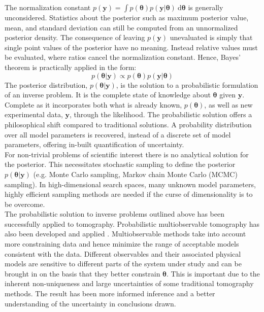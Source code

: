 The normalization constant $p(\bm{y}) = \int p(\bm{\theta}) p(\bm{y}|\bm{\theta})\ \text{d}\bm{\theta}$ is generally unconsidered. Statistics about the posterior such as maximum posterior value, mean, and standard deviation can still be computed from an unnormalized posterior density. The consequence of leaving $p(\bm{y})$ unevaluated is simply that single point values of the posterior have no meaning. Instead relative values must be evaluated, where ratios cancel the normalization constant. Hence, Bayes' theorem is practically applied in the form:
\begin{equation}
p(\bm{\theta}|\bm{y}) \propto p(\bm{\theta}) p(\bm{y}|\bm{\theta})
\label{applied_bayes}	
\end{equation}
The posterior distribution, $p(\bm{\theta}|\bm{y})$, is the solution to a probabilistic formulation of an inverse problem. It is the complete state of knowledge about $\bm{\theta}$ given $\bm{y}$. Complete as it incorporates both what is already known, $p(\bm{\theta})$, as well as new experimental data, $\bm{y}$, through the likelihood. The probabilistic solution offers a philosophical shift compared to traditional solutions. A probability distribution over all model parameters is recovered, instead of a discrete set of model parameters, offering in-built quantification of uncertainty. \\

For non-trivial problems of scientific interest there is no analytical solution for the posterior. This necessitates stochastic sampling to define the posterior $p(\bm{\theta}|\bm{y})$ (e.g. Monte Carlo sampling, Markov chain Monte Carlo (MCMC) sampling). In high-dimensional search spaces, many unknown model parameters, highly efficient sampling methods are needed if the curse of dimensionality is to be overcome.\\

The probabilistic solution to inverse problems outlined above has been successfully applied to tomography. Probabilistic multiobservable tomography has also been developed  and applied \citep{khan2007joint,afonso2013a,afonso2013b,afonso2016}. Multiobservable methods take into account more constraining data and hence minimize the range of acceptable models consistent with the data. Different observables and their associated physical models are sensitive to different parts of the system under study and can be brought in on the basis that they better constrain $\bm{\theta}$. This is important due to the inherent non-uniqueness and large uncertainties of some traditional tomography methods. The result has been more informed inference and a better understanding of the uncertainty in conclusions drawn.\\

